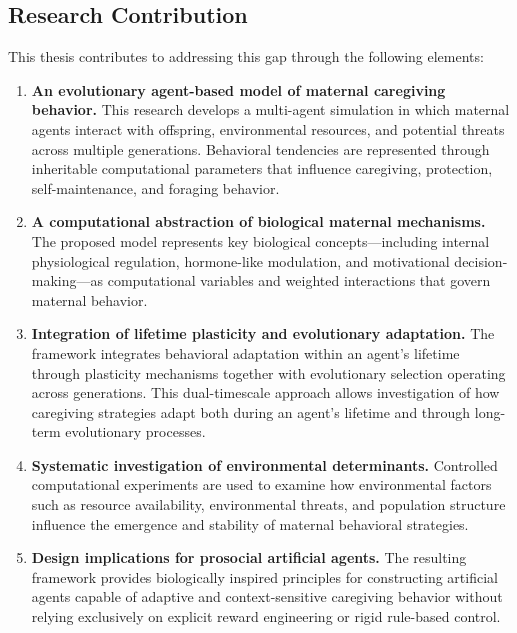 \subsection{Research Contribution}

This thesis contributes to addressing this gap through the following elements:

\begin{enumerate}
    \item \textbf{An evolutionary agent-based model of maternal caregiving behavior.}  
    This research develops a multi-agent simulation in which maternal agents interact with offspring, environmental resources, and potential threats across multiple generations. Behavioral tendencies are represented through inheritable computational parameters that influence caregiving, protection, self-maintenance, and foraging behavior.

    \item \textbf{A computational abstraction of biological maternal mechanisms.}  
    The proposed model represents key biological concepts—including internal physiological regulation, hormone-like modulation, and motivational decision-making—as computational variables and weighted interactions that govern maternal behavior.

    \item \textbf{Integration of lifetime plasticity and evolutionary adaptation.}  
    The framework integrates behavioral adaptation within an agent's lifetime through plasticity mechanisms together with evolutionary selection operating across generations. This dual-timescale approach allows investigation of how caregiving strategies adapt both during an agent's lifetime and through long-term evolutionary processes.

    \item \textbf{Systematic investigation of environmental determinants.}  
    Controlled computational experiments are used to examine how environmental factors such as resource availability, environmental threats, and population structure influence the emergence and stability of maternal behavioral strategies.

    \item \textbf{Design implications for prosocial artificial agents.}  
    The resulting framework provides biologically inspired principles for constructing artificial agents capable of adaptive and context-sensitive caregiving behavior without relying exclusively on explicit reward engineering or rigid rule-based control.
\end{enumerate}




